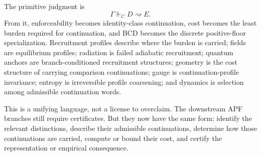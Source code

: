 \documentclass[11pt]{article}
\theoremstyle{remark}
\newcommand{\G}{\Gamma}
\newcommand{\entails}{\Vdash}
\newcommand{\goes}{\rightsquigarrow}
\begin{document}
The primitive judgment is
\[
        \G\entails_C D\goes E.
\]
From it, enforceability becomes identity-class continuation, cost becomes the least burden required for continuation, and BCD becomes the discrete positive-floor specialization.  Recruitment profiles describe where the burden is carried; fields are equilibrium profiles; radiation is failed adiabatic recruitment; quantum anchors are branch-conditioned recruitment structures; geometry is the cost structure of carrying comparison continuations; gauge is continuation-profile invariance; entropy is irreversible profile coarsening; and dynamics is selection among admissible continuation words.

This is a unifying language, not a license to overclaim.  The downstream APF branches still require certificates.  But they now have the same form: identify the relevant distinctions, describe their admissible continuations, determine how those continuations are carried, compute or bound their cost, and certify the representation or empirical consequence.

\begin{center}
\end{center}
\end{document}
